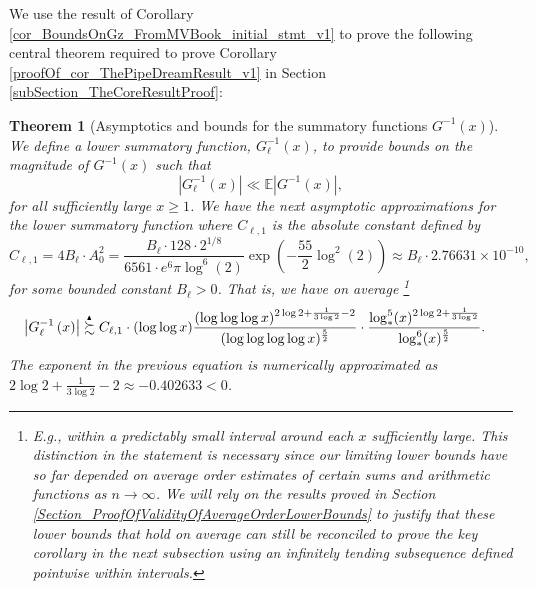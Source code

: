 \documentclass[11pt,reqno,a4letter]{article}
\numberwithin{figure}{section}
\numberwithin{table}{section}
\theoremstyle{plain}
\newtheorem{theorem}{Theorem}
\numberwithin{theorem}{section}
\theoremstyle{definition}
\newcommand{\SuccSim}[0]{\overset{_{\scriptsize{\blacktriangle}}}{\succsim}}
\begin{document}
We use the result of 
Corollary \ref{cor_BoundsOnGz_FromMVBook_initial_stmt_v1} 
to prove the following central theorem required to prove 
Corollary \ref{proofOf_cor_ThePipeDreamResult_v1} in Section \ref{subSection_TheCoreResultProof}: 

\begin{theorem}[Asymptotics and bounds for the summatory functions $G^{-1}(x)$] 
\label{theorem_gInv_GeneralAsymptoticsForms}
We define a lower summatory function, $G_{\ell}^{-1}(x)$, 
to provide bounds on the magnitude of $G^{-1}(x)$ such that 
$$|G_{\ell}^{-1}(x)| \ll \mathbb{E}|G^{-1}(x)|,$$ for all sufficiently large $x \geq 1$. 
We have the next asymptotic approximations for the lower summatory function where 
$C_{\ell,1}$ is the absolute constant defined by 
\[
C_{\ell,1} = 4B_{\ell} \cdot A_0^2  = 
     \frac{B_{\ell} \cdot 128 \cdot 2^{1/8}}{6561 \cdot e^6 \pi \log^6(2)} 
     \exp\left(-\frac{55}{2} \log^2(2)\right) 
     \approx B_{\ell} \cdot 2.76631 \times 10^{-10}, 
\]
for some bounded constant $B_{\ell} > 0$. 
That is, we have on average \footnote{ 
     E.g., within a predictably small interval around each $x$ sufficiently large. 
     This distinction in the statement is necessary since our limiting lower bounds have 
     so far depended on average order estimates of certain sums and arithmetic functions 
     as $n \rightarrow \infty$. We will rely on the results proved in 
     Section \ref{Section_ProofOfValidityOfAverageOrderLowerBounds} to justify that these 
     lower bounds that hold on average can still be reconciled to prove 
     the key corollary in the next subsection using an infinitely tending subsequence 
     defined pointwise within intervals. 
}
\begin{align*} 
 & \left\lvert G_{\ell}^{-1}\left(x\right) \right\rvert
     \SuccSim 
     C_{\ell,1} \cdot (\log\log x) \frac{(\log\log\log x)^{2\log 2+\frac{1}{3\log 2} - 2}}{ 
     (\log\log\log\log x)^{\frac{5}{2}}} \cdot \frac{\log_{\ast}^5(x)^{2\log 2 + \frac{1}{3\log 2}}}{ 
     \log_{\ast}^{6}(x)^{\frac{5}{2}}}. 
\end{align*} 
The exponent in the previous equation is numerically approximated as 
$2\log 2 + \frac{1}{3\log 2} -2 \approx -0.402633 < 0$. 
\end{theorem} 
\end{document}
